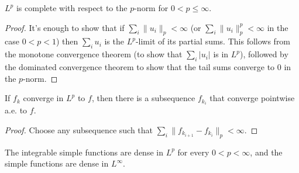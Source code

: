 \documentclass[letterpaper,11pt]{report}
\begin{document}
\begin{thm}\label{Riesz-Fischer-Lp} $L^p$ is complete with respect to the $p$-norm for $0 < p \le \infty$.
\end{thm}
\begin{proof} It's enough to show that if $\sum_i \|u_i\|_p < \infty$ (or $\sum_i \|u_i\|_p^p < \infty$ in the case $0 < p < 1$) then $\sum_i u_i$ is the $L^p$-limit of its partial sums. This follows from the monotone convergence theorem (to show that $\sum_i |u_i|$ is in $L^p$), followed by the dominated convergence theorem to show that the tail sums converge to $0$ in the $p$-norm.
\end{proof}

\begin{cor} If $f_k$ converge in $L^p$ to $f$, then there is a subsequence $f_{k_i}$ that converge pointwise a.e. to $f$.
\end{cor}
\begin{proof} Choose any subsequence such that $\sum_i \|f_{k_{i+1}} - f_{k_i}\|_p < \infty$.
\end{proof}

\begin{prop} The integrable simple functions are dense in $L^p$ for every $0 < p < \infty$, and the simple functions are dense in $L^\infty$.
\end{prop}
\end{document}
